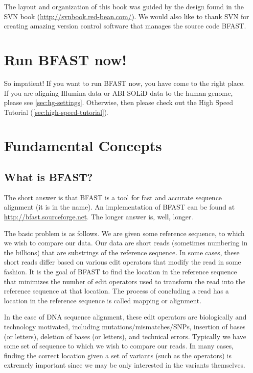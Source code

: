 \documentclass[a4paper,12pt]{book}
\begin{document}
The layout and organization of this book was guided by the design found in the SVN book (\url{http://svnbook.red-bean.com/}).
We would also like to thank SVN for creating amazing version control software that manages the source code BFAST.
\mainmatter

\chapter{Run BFAST now!}
So impatient!
If you want to run BFAST now, you have come to the right place.
If you are aligning Illumina data or ABI SOLiD data to the human genome, please see \autoref{sec:hg-settings}.  
Otherwise, then please check out the High Speed Tutorial (\autoref{sec:high-speed-tutorial}).

\chapter{Fundamental Concepts}
\section{What is BFAST?}
The short answer is that BFAST is a tool for fast and accurate sequence alignment (it is in the name).
An implementation of BFAST can be found at \url{http://bfast.sourceforge.net}.
The longer answer is, well, longer.

The basic problem is as follows.
We are given some reference sequence, to which we wish to compare our data.
Our data are short reads (sometimes numbering in the billions) that are substrings of the reference sequence.
In some cases, these short reads differ based on various edit operators that modify the read in some fashion.
It is the goal of BFAST to find the location in the reference sequence that minimizes the number of edit operators used to transform the read into the reference sequence at that location.
The process of concluding a read has a location in the reference sequence is called mapping or alignment.

In the case of DNA sequence alignment, these edit operators are biologically and technology motivated, including mutations/mismatches/SNPs, insertion of bases (or letters), deletion of bases (or letters), and technical errors. 
Typically we have some set of sequence to which we wish to compare our reads.
In many cases, finding the correct location given a set of variants (such as the operators) is extremely important since we may be only interested in the variants themselves.
\end{document}
